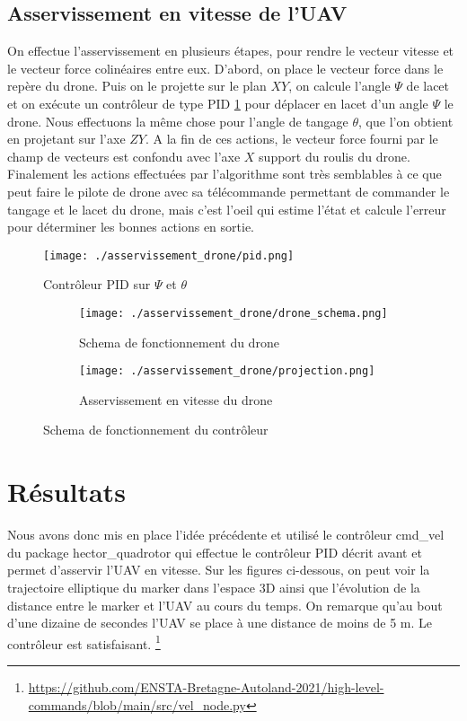 \subsection{Asservissement en vitesse de l'UAV}
On effectue l’asservissement en plusieurs étapes, pour rendre le vecteur vitesse et le vecteur force colinéaires entre eux. 
D’abord, on place le vecteur force dans le repère du drone. Puis on le projette sur le plan $XY$, on calcule l’angle $\Psi$ de lacet et 
on exécute un contrôleur de type PID \ref{fig:pid} pour déplacer en lacet d’un angle $\Psi$ le drone. 
Nous effectuons la même chose pour l’angle de tangage $\theta$, que l’on obtient en projetant sur l’axe $ZY$. 
A la fin de ces actions, le vecteur force fourni par le champ de vecteurs est confondu avec l’axe $X$ 
support du roulis du drone. Finalement les actions effectuées par l’algorithme sont très semblables 
à ce que peut faire le pilote de drone avec sa télécommande permettant de commander le tangage et le lacet du drone, 
mais c’est l'oeil qui estime l’état et calcule l’erreur pour déterminer les bonnes actions en sortie. 

\begin{figure}[!htb]
    \centering
    \texttt{[image: ./asservissement\_drone/pid.png]}
    \caption{Contrôleur PID sur $\Psi$ et $\theta$}
    \label{fig:pid}
\end{figure}


\begin{figure}[!htb]
    \centering
    \begin{subfigure}[b]{0.4\textwidth}
        \centering
        \texttt{[image: ./asservissement\_drone/drone\_schema.png]}
        \caption{Schema de fonctionnement du drone}
        \label{fig:marker}
    \end{subfigure}
    \hfill
    \begin{subfigure}[b]{0.4\textwidth}
        \centering
        \texttt{[image: ./asservissement\_drone/projection.png]}
        \caption{Asservissement en vitesse du drone}
        \label{fig:manifold}
    \end{subfigure}
    \caption{Schema de fonctionnement du contrôleur}
    \label{fig:environnement}
\end{figure}

\section{Résultats}

Nous avons donc mis en place l’idée précédente et utilisé le contrôleur cmd\_vel
du package hector\_quadrotor qui effectue le contrôleur PID décrit avant et permet d’asservir l’UAV en vitesse.
Sur les figures ci-dessous, on peut voir la trajectoire elliptique du marker dans l’espace 3D ainsi que 
l’évolution de la distance entre le marker et l’UAV au cours du temps. 
On remarque qu’au bout d’une dizaine de secondes l’UAV se place à une distance de moins de 5 m. 
Le contrôleur est satisfaisant. \footnote{\url{https://github.com/ENSTA-Bretagne-Autoland-2021/high-level-commands/blob/main/src/vel_node.py}}

